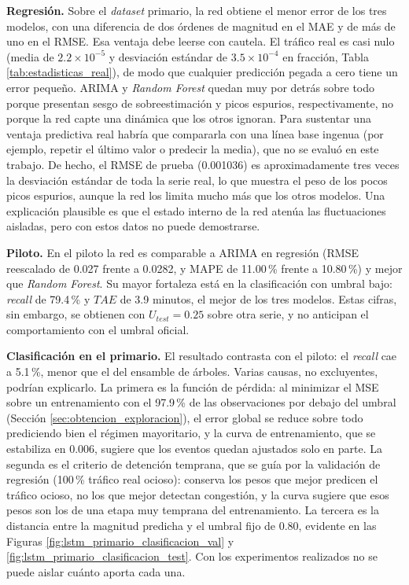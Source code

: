 \documentclass[12pt]{report}
\begin{document}
\textbf{Regresión.} Sobre el \textit{dataset} primario, la red obtiene el menor error de los tres modelos, con una diferencia de dos órdenes de magnitud en el MAE y de más de uno en el RMSE. Esa ventaja debe leerse con cautela. El tráfico real es casi nulo (media de $2.2 \times 10^{-5}$ y desviación estándar de $3.5 \times 10^{-4}$ en fracción, Tabla \ref{tab:estadisticas_real}), de modo que cualquier predicción pegada a cero tiene un error pequeño. ARIMA y \textit{Random Forest} quedan muy por detrás sobre todo porque presentan sesgo de sobreestimación y picos espurios, respectivamente, no porque la red capte una dinámica que los otros ignoran. Para sustentar una ventaja predictiva real habría que compararla con una línea base ingenua (por ejemplo, repetir el último valor o predecir la media), que no se evaluó en este trabajo. De hecho, el RMSE de prueba (0.001036) es aproximadamente tres veces la desviación estándar de toda la serie real, lo que muestra el peso de los pocos picos espurios, aunque la red los limita mucho más que los otros modelos. Una explicación plausible es que el estado interno de la red atenúa las fluctuaciones aisladas, pero con estos datos no puede demostrarse.

\textbf{Piloto.} En el piloto la red es comparable a ARIMA en regresión (RMSE reescalado de 0.027 frente a 0.0282, y MAPE de 11.00\,\% frente a 10.80\,\%) y mejor que \textit{Random Forest}. Su mayor fortaleza está en la clasificación con umbral bajo: \textit{recall} de 79.4\,\% y $TAE$ de 3.9 minutos, el mejor de los tres modelos. Estas cifras, sin embargo, se obtienen con $U_{test}=0.25$ sobre otra serie, y no anticipan el comportamiento con el umbral oficial.

\textbf{Clasificación en el primario.} El resultado contrasta con el piloto: el \textit{recall} cae a 5.1\,\%, menor que el del ensamble de árboles. Varias causas, no excluyentes, podrían explicarlo. La primera es la función de pérdida: al minimizar el MSE sobre un entrenamiento con el 97.9\,\% de las observaciones por debajo del umbral (Sección \ref{sec:obtencion_exploracion}), el error global se reduce sobre todo prediciendo bien el régimen mayoritario, y la curva de entrenamiento, que se estabiliza en 0.006, sugiere que los eventos quedan ajustados solo en parte. La segunda es el criterio de detención temprana, que se guía por la validación de regresión (100\,\% tráfico real ocioso): conserva los pesos que mejor predicen el tráfico ocioso, no los que mejor detectan congestión, y la curva sugiere que esos pesos son los de una etapa muy temprana del entrenamiento. La tercera es la distancia entre la magnitud predicha y el umbral fijo de 0.80, evidente en las Figuras \ref{fig:lstm_primario_clasificacion_val} y \ref{fig:lstm_primario_clasificacion_test}. Con los experimentos realizados no se puede aislar cuánto aporta cada una.
\end{document}
